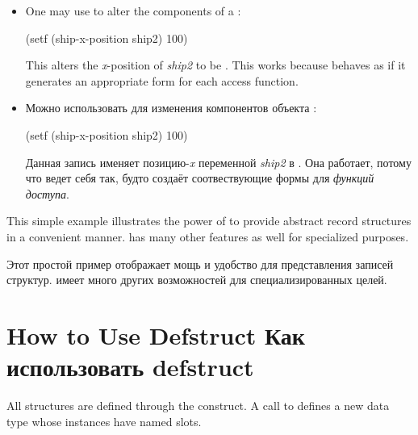 \begin{itemize}
\item
One may use  to alter the components of a :
\begin{lisp}
(setf (ship-x-position ship2) 100)
\end{lisp}
This alters the \emph{x}-position of \emph{ship2} to be .
This works because  behaves as if
it generates an appropriate 
form for each access function.

\item 
Можно использовать  для изменения компонентов объекта :
\begin{lisp}
(setf (ship-x-position ship2) 100)
\end{lisp}
Данная запись именяет позицию-\emph{x} переменной \emph{ship2} в .
Она работает, потому что  ведет себя так, будто создаёт
соотвествующие  формы для \emph{функций доступа}.
\end{itemize}

This simple example illustrates the power of  to provide
abstract record structures in a convenient manner.
 has many other features as well for specialized purposes.

Этот простой пример отображает мощь и удобство  для представления
записей структур.
 имеет много других возможностей для специализированных целей.

\section{How to Use Defstruct Как использовать defstruct}

All structures are defined through the  construct.
A call to  defines a new data type whose instances
have named slots.

